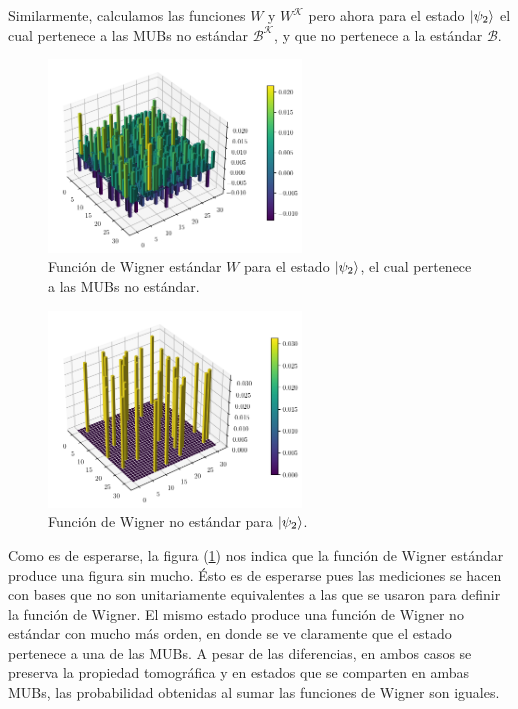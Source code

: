 \documentclass[a4paper,11pt]{report}
\begin{document}
  Similarmente, calculamos las funciones $W$ y $W^{\mathcal
  K}$ pero ahora para el estado $\ket{\psi_2}$ el cual
  pertenece a las MUBs no estándar $\mathcal B^{\mathcal
  K}$, y que no pertenece a la estándar $\mathcal B$.
  \begin{figure}[ht]
    \centering
    \includegraphics[width=0.6\textwidth]{
    imgs/wigner-standard-2-5-s2.png}
    \caption{Función de Wigner estándar $W$ para el estado
    $\ket{\psi_2}$, el cual pertenece a las MUBs no estándar.}
    \label{fig:wigner-standard-2-5-s2}
  \end{figure}
  \begin{figure}[ht]
    \centering
    \includegraphics[width=0.6\textwidth]{
    imgs/wigner-kantor-2-5-s2.png}
    \caption{Función de Wigner no estándar para
      $\ket{\psi_2}$.}
    \label{fig:wigner-kantor-2-5-s2}
  \end{figure}
  Como es de esperarse, la figura
  (\ref{fig:wigner-standard-2-5-s2}) nos indica que la
  función de Wigner estándar produce una figura sin mucho.
  Ésto es de esperarse pues las mediciones se hacen con
  bases que no son unitariamente equivalentes a las que se
  usaron para definir la función de Wigner. El mismo estado
  produce una función de Wigner no estándar con mucho más
  orden, en donde se ve claramente que el estado pertenece a
  una de las MUBs. A pesar de las diferencias, en ambos
  casos se preserva la propiedad tomográfica y en estados
  que se comparten en ambas MUBs, las probabilidad obtenidas
  al sumar las funciones de Wigner son iguales.
\end{document}
